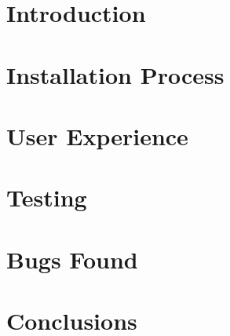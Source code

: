 \setcounter{page}{2}


\newpage
\tableofcontents
\newpage
{}
{}
\listoftables

\clearpage
\section{Introduction}
\label{sect:introduction}


\clearpage
\section{Installation Process}
\label{sect:installsetup}


\clearpage
\section{User Experience}
\label{sect:ux}


\clearpage
\section{Testing}
\label{sect:testing}


\clearpage
\section{Bugs Found}
\label{sect:bugs}


\clearpage
\section{Conclusions}
\label{sect:conclusions}




